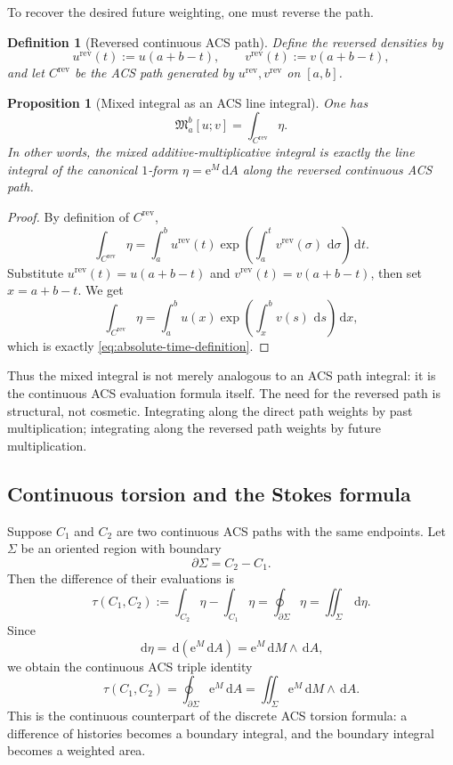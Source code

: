 \documentclass[11pt]{article}
\newtheorem{definition}{Definition}
\newtheorem{proposition}{Proposition}
\newcommand{\maint}[2]{\mathfrak{M}_{#1}^{#2}}
\newcommand{\rev}{\mathrm{rev}}
\newcommand{\dd}{\,\mathrm{d}}
\newcommand{\ee}{\mathrm{e}}
\begin{document}
To recover the desired future weighting, one must reverse the path.

\begin{definition}[Reversed continuous ACS path]
\label{def:reversed-path}
Define the reversed densities by
\[
u^{\rev}(t):=u(a+b-t),
\qquad
v^{\rev}(t):=v(a+b-t),
\]
and let $C^{\rev}$ be the ACS path generated by $u^{\rev},v^{\rev}$ on $[a,b]$.
\end{definition}

\begin{proposition}[Mixed integral as an ACS line integral]
\label{prop:acs-line-integral}
One has
\begin{equation}
\label{eq:acs-line-integral}
\maint{a}{b}[u;v]
=
\int_{C^{\rev}} \eta.
\end{equation}
In other words, the mixed additive-multiplicative integral is exactly the line integral of the canonical $1$-form $\eta=\ee^M\dd A$ along the reversed continuous ACS path.
\end{proposition}

\begin{proof}
By definition of $C^{\rev}$,
\[
\int_{C^{\rev}} \eta
=
\int_a^b u^{\rev}(t)
\exp\!\left(\int_a^t v^{\rev}(\sigma)\,\dd\sigma\right)
\dd t.
\]
Substitute $u^{\rev}(t)=u(a+b-t)$ and $v^{\rev}(t)=v(a+b-t)$, then set $x=a+b-t$. We get
\[
\int_{C^{\rev}} \eta
=
\int_a^b u(x)
\exp\!\left(\int_x^b v(s)\,\dd s\right)
\dd x,
\]
which is exactly \eqref{eq:absolute-time-definition}.
\end{proof}

Thus the mixed integral is not merely analogous to an ACS path integral: it is the continuous ACS evaluation formula itself. The need for the reversed path is structural, not cosmetic. Integrating along the direct path weights by past multiplication; integrating along the reversed path weights by future multiplication.

\subsection{Continuous torsion and the Stokes formula}

Suppose $C_1$ and $C_2$ are two continuous ACS paths with the same endpoints. Let $\Sigma$ be an oriented region with boundary
\[
\partial\Sigma=C_2-C_1.
\]
Then the difference of their evaluations is
\begin{equation}
\label{eq:continuous-torsion}
\tau(C_1,C_2)
:=
\int_{C_2}\eta-\int_{C_1}\eta
=
\oint_{\partial\Sigma}\eta
=
\iint_\Sigma \dd\eta.
\end{equation}
Since
\[
\dd\eta = \dd(\ee^M\dd A)=\ee^M\dd M\wedge \dd A,
\]
we obtain the continuous ACS triple identity
\begin{equation}
\label{eq:continuous-triple}
\tau(C_1,C_2)
=
\oint_{\partial\Sigma} \ee^M\dd A
=
\iint_\Sigma \ee^M\dd M\wedge \dd A.
\end{equation}
This is the continuous counterpart of the discrete ACS torsion formula: a difference of histories becomes a boundary integral, and the boundary integral becomes a weighted area.
\end{document}
